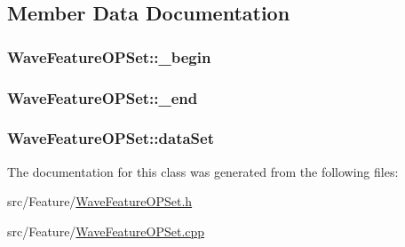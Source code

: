 \subsection{Member Data Documentation}
\hypertarget{class_wave_feature_o_p_set_aa827cacdbc67e23d46aa75e09d0a7c81}{
\subsubsection[{\+\_\+begin}]{ Wave\+Feature\+O\+P\+Set\+::\+\_\+begin\hspace{0.3cm}{\ttfamily [private]}}}\label{class_wave_feature_o_p_set_aa827cacdbc67e23d46aa75e09d0a7c81}
\hypertarget{class_wave_feature_o_p_set_a90181c57111ae23c2cfd00f8c3e738a1}{
\subsubsection[{\+\_\+end}]{ Wave\+Feature\+O\+P\+Set\+::\+\_\+end\hspace{0.3cm}{\ttfamily [private]}}}\label{class_wave_feature_o_p_set_a90181c57111ae23c2cfd00f8c3e738a1}
\hypertarget{class_wave_feature_o_p_set_ab536eab1f12dec8e95c4459f6cbcd3f1}{
\subsubsection[{data\+Set}]{ Wave\+Feature\+O\+P\+Set\+::data\+Set\hspace{0.3cm}{\ttfamily [protected]}}}\label{class_wave_feature_o_p_set_ab536eab1f12dec8e95c4459f6cbcd3f1}


The documentation for this class was generated from the following files\+:\begin{DoxyCompactItemize}
\item 
src/\+Feature/\hyperlink{_wave_feature_o_p_set_8h}{Wave\+Feature\+O\+P\+Set.\+h}\item 
src/\+Feature/\hyperlink{_wave_feature_o_p_set_8cpp}{Wave\+Feature\+O\+P\+Set.\+cpp}\end{DoxyCompactItemize}
